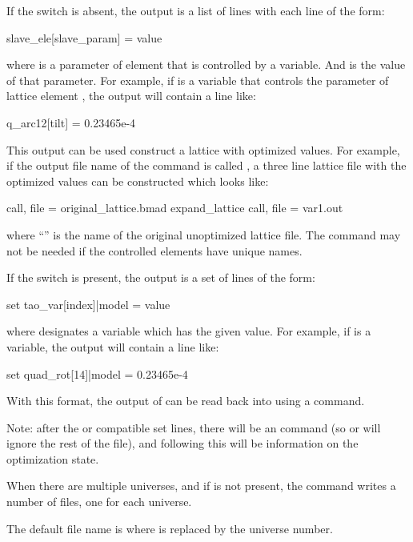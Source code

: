{{{{{{{{{{{{If the  switch is absent, the output is a list of lines with each line of the form:
\begin{example}
  slave_ele[slave_param] = value
\end{example}
where  is a parameter of \bmad element  that is controlled by a \tao
variable. And  is the value of that parameter. For example, if  is a \tao
variable that controls the  parameter of \bmad lattice element , the output
will contain a line like:
\begin{example}
  q_arc12[tilt] = 0.23465e-4
\end{example}
This output can be used construct a lattice with optimized values. For example, if the output file
name of the  command is called , a three line lattice file with the
optimized values can be constructed which looks like:
\begin{example}
  call, file = original_lattice.bmad
  expand_lattice
  call, file = var1.out
\end{example}
where ``'' is the name of the original unoptimized lattice file. The
 command may not be needed if the controlled \bmad elements have unique names.

If the  switch is present, the output is a set of lines of the form:
\begin{example}
  set tao_var[index]|model = value
\end{example}
where  designates a \tao variable which has the given  value. For
example, if  is a \tao variable, the output
will contain a line like:
\begin{example}
  set quad_rot[14]|model = 0.23465e-4
\end{example}
With this format, the output of  can be read back into \tao using a 
command.

Note: after the \bmad or \tao compatible set lines, there will be an  command (so \bmad
or \tao will ignore the rest of the file), and following this will be information on the
optimization state.

When there are multiple universes, and if  is not present, the 
command writes a number of files, one for each universe.

The default file name is  where \vn{\#} is replaced by the universe number. 

}}}}}}}}}}}}
